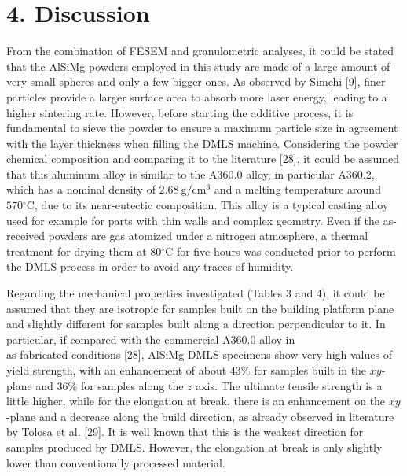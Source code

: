 \documentclass[10pt]{article}
\begin{document}
\section*{4. Discussion}
From the combination of FESEM and granulometric analyses, it could be stated that the AlSiMg powders employed in this study are made of a large amount of very small spheres and only a few bigger ones. As observed by Simchi [9], finer particles provide a larger surface area to absorb more laser energy, leading to a higher sintering rate. However, before starting the additive process, it is fundamental to sieve the powder to ensure a maximum particle size in agreement with the layer thickness when filling the DMLS machine. Considering the powder chemical composition and comparing it to the literature [28], it could be assumed that this aluminum alloy is similar to the A360.0 alloy, in particular A360.2, which has a nominal density of $2.68 \mathrm{~g} / \mathrm{cm}^{3}$ and a melting temperature around $570{ }^{\circ} \mathrm{C}$, due to its near-eutectic composition. This alloy is a typical casting alloy used for example for parts with thin walls and complex geometry. Even if the as-received powders are gas atomized under a nitrogen atmosphere, a thermal treatment for drying them at $80{ }^{\circ} \mathrm{C}$ for five hours was conducted prior to perform the DMLS process in order to avoid any traces of humidity.

Regarding the mechanical properties investigated (Tables 3 and 4), it could be assumed that they are isotropic for samples built on the building platform plane and slightly different for samples built along a direction perpendicular to it. In particular, if compared with the commercial A360.0 alloy in\\
as-fabricated conditions [28], AlSiMg DMLS specimens show very high values of yield strength, with an enhancement of about $43 \%$ for samples built in the $x y$-plane and $36 \%$ for samples along the $z$ axis. The ultimate tensile strength is a little higher, while for the elongation at break, there is an enhancement on the $x y$-plane and a decrease along the build direction, as already observed in literature by Tolosa et al. [29]. It is well known that this is the weakest direction for samples produced by DMLS. However, the elongation at break is only slightly lower than conventionally processed material.
\end{document}
